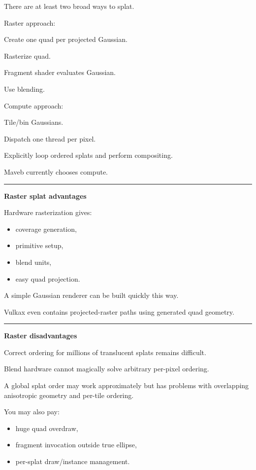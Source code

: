 There are at least two broad ways to splat.

Raster approach:

Create one quad per projected Gaussian.

Rasterize quad.

Fragment shader evaluates Gaussian.

Use blending.

Compute approach:

Tile/bin Gaussians.

Dispatch one thread per pixel.

Explicitly loop ordered splats and perform compositing.

Maveb currently chooses compute.

\begin{center}\rule{0.5\linewidth}{0.5pt}\end{center}

\textbf{Raster splat advantages}

Hardware rasterization gives:

\begin{itemize}
\tightlist
\item
  coverage generation,
\item
  primitive setup,
\item
  blend units,
\item
  easy quad projection.
\end{itemize}

A simple Gaussian renderer can be built quickly this way.

Vulkax even contains projected-raster paths using generated quad geometry.

\begin{center}\rule{0.5\linewidth}{0.5pt}\end{center}

\textbf{Raster disadvantages}

Correct ordering for millions of translucent splats remains difficult.

Blend hardware cannot magically solve arbitrary per-pixel ordering.

A global splat order may work approximately but has problems with overlapping anisotropic geometry and per-tile ordering.

You may also pay:

\begin{itemize}
\tightlist
\item
  huge quad overdraw,
\item
  fragment invocation outside true ellipse,
\item
  per-splat draw/instance management.
\end{itemize}

